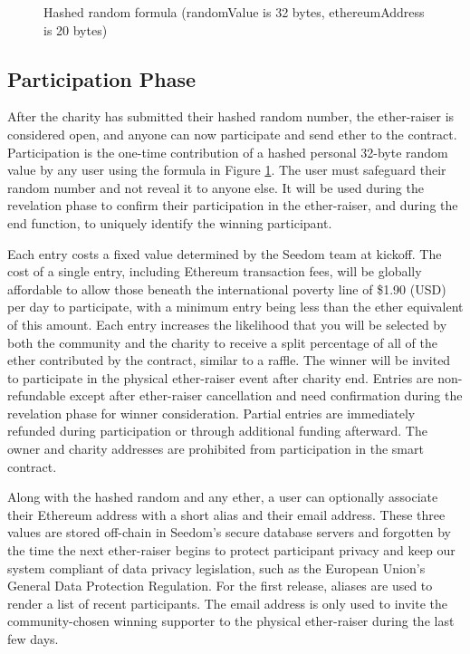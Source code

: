 \documentclass[11pt]{article}
\begin{document}
\begin{figure}[H]
\begin{center}
\caption{Hashed random formula (randomValue is 32 bytes, ethereumAddress is 20 bytes)}
\label{figure:hashedRandomFormula}
\end{center}
\end{figure}

\subsection{Participation Phase}

After the charity has submitted their hashed random number, the ether-raiser is considered open, and anyone can now participate and send ether to the contract. Participation is the one-time contribution of a hashed personal 32-byte random value by any user using the formula in Figure \ref{figure:hashedRandomFormula}. The user must safeguard their random number and not reveal it to anyone else. It will be used during the revelation phase to confirm their participation in the ether-raiser, and during the end function, to uniquely identify the winning participant.

Each entry costs a fixed value determined by the Seedom team at kickoff. The cost of a single entry, including Ethereum transaction fees, will be globally affordable to allow those beneath the international poverty line of \$1.90 (USD) per day \cite{1} to participate, with a minimum entry being less than the ether equivalent of this amount. Each entry increases the likelihood that you will be selected by both the community and the charity to receive a split percentage of all of the ether contributed by the contract, similar to a raffle. The winner will be invited to participate in the physical ether-raiser event after charity end. Entries are non-refundable except after ether-raiser cancellation and need confirmation during the revelation phase for winner consideration. Partial entries are immediately refunded during participation or through additional funding afterward. The owner and charity addresses are prohibited from participation in the smart contract.

Along with the hashed random and any ether, a user can optionally associate their Ethereum address with a short alias and their email address. These three values are stored off-chain in Seedom's secure database servers and forgotten by the time the next ether-raiser begins to protect participant privacy and keep our system compliant of data privacy legislation, such as the European Union's General Data Protection Regulation. For the first release, aliases are used to render a list of recent participants. The email address is only used to invite the community-chosen winning supporter to the physical ether-raiser during the last few days.
\end{document}
